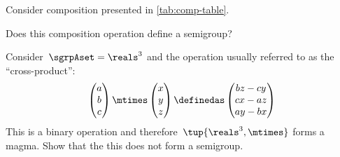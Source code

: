 \begin{gradedexercise}
    \label{ex:CompositionTable}
    Consider composition presented in \cref{tab:comp-table}.
    \begin{comment}
        \begin{center}
            \begin{tabular}{c|cc}
                $\mtimes$       & $\alphabetasymba$ & $\alphabetasymbb$ \\
                \hline
                \alphabetasymba & \alphabetasymba   & \alphabetasymba   \\
                \alphabetasymbb & \alphabetasymbb   & \alphabetasymba
            \end{tabular}
        \end{center}
    \end{comment}
    Does this composition operation define a semigroup?
\end{gradedexercise}

\begin{exercise}
    \label{ex:cross_prod}
    Consider~$\sgrpAset=\reals^3$ and the operation usually referred to as the ``cross-product'':
    \begin{equation*}
        \begin{pmatrix}
            a\\ b\\ c
        \end{pmatrix}\mtimes \begin{pmatrix}
                                 x\\ y \\ z
        \end{pmatrix}\definedas
        \begin{pmatrix}
            bz-cy\\
            cx-az\\
            ay-bx
        \end{pmatrix}
    \end{equation*}
    This is a binary operation and therefore~$\tup{\reals^3,\mtimes}$ forms a magma. Show that the this does not form a semigroup.
\end{exercise}
\begin{solution}
\end{solution}


